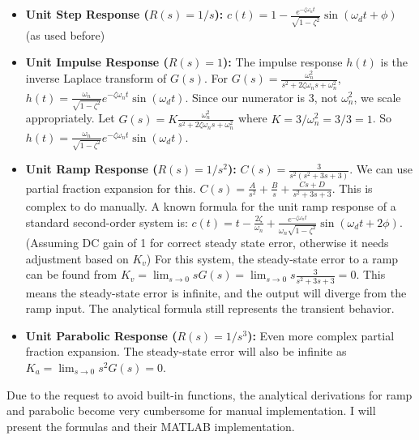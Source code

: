 \documentclass{article}
\begin{document}
	\begin{itemize}
		\item \textbf{Unit Step Response ($R(s) = 1/s$):}
		$c(t) = 1 - \frac{e^{-\zeta\omega_n t}}{\sqrt{1-\zeta^2}} \sin(\omega_d t + \phi)$ (as used before)
		
		\item \textbf{Unit Impulse Response ($R(s) = 1$):}
		The impulse response $h(t)$ is the inverse Laplace transform of $G(s)$.
		For $G(s) = \frac{\omega_n^2}{s^2+2\zeta\omega_n s+\omega_n^2}$,
		$h(t) = \frac{\omega_n}{\sqrt{1-\zeta^2}} e^{-\zeta\omega_n t} \sin(\omega_d t)$.
		Since our numerator is 3, not $\omega_n^2$, we scale appropriately. Let $G(s) = K \frac{\omega_n^2}{s^2+2\zeta\omega_n s+\omega_n^2}$ where $K = 3/\omega_n^2 = 3/3 = 1$.
		So $h(t) = \frac{\omega_n}{\sqrt{1-\zeta^2}} e^{-\zeta\omega_n t} \sin(\omega_d t)$.
		
		\item \textbf{Unit Ramp Response ($R(s) = 1/s^2$):}
		$C(s) = \frac{3}{s^2(s^2+3s+3)}$. We can use partial fraction expansion for this.
		$C(s) = \frac{A}{s^2} + \frac{B}{s} + \frac{Cs+D}{s^2+3s+3}$.
		This is complex to do manually. A known formula for the unit ramp response of a standard second-order system is:
		$c(t) = t - \frac{2\zeta}{\omega_n} + \frac{e^{-\zeta\omega_n t}}{\omega_n\sqrt{1-\zeta^2}} \sin(\omega_d t + 2\phi)$.
		(Assuming DC gain of 1 for correct steady state error, otherwise it needs adjustment based on $K_v$)
		For this system, the steady-state error to a ramp can be found from $K_v = \lim_{s \to 0} sG(s) = \lim_{s \to 0} s \frac{3}{s^2+3s+3} = 0$. This means the steady-state error is infinite, and the output will diverge from the ramp input. The analytical formula still represents the transient behavior.
		
		\item \textbf{Unit Parabolic Response ($R(s) = 1/s^3$):}
		Even more complex partial fraction expansion. The steady-state error will also be infinite as $K_a = \lim_{s \to 0} s^2 G(s) = 0$.
		
	\end{itemize}
	Due to the request to avoid built-in functions, the analytical derivations for ramp and parabolic become very cumbersome for manual implementation. I will present the formulas and their MATLAB implementation.
	
\end{document}
